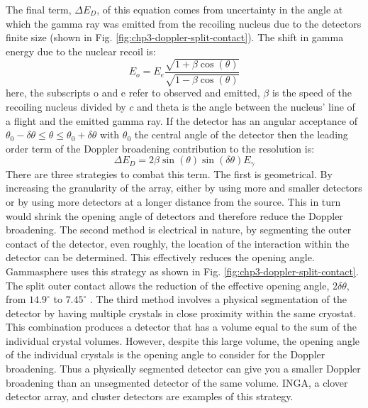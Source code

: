 The final term, $\Delta{}E_{D}$, of this equation comes from uncertainty in the angle at which the gamma ray was emitted from the recoiling nucleus due to the detectors finite size (shown in Fig. \ref{fig:chp3-doppler-split-contact}). The shift in gamma energy due to the nuclear recoil is:
\begin{equation}
\label{eqn:chp3-doppler_formula} 
E_{o} = E_{e}\frac{\sqrt{1+\beta{}\cos(\theta)}}{\sqrt{1-\beta{}\cos(\theta)}}
\end{equation}
here, the subscripts o and e refer to observed and emitted, $\beta$ is the speed of the recoiling nucleus divided by $c$ and theta is the angle between the nucleus' line of a flight and the emitted gamma ray. If the detector has an angular acceptance of $\theta{}_{0}-\delta{}\theta{}\leq{}\theta{}\leq{}\theta{}_{0}+\delta{}\theta{}$ with $\theta{}_{0}$ the central angle of the detector then the leading order term of the Doppler broadening contribution to the resolution is:
\begin{equation}
\label{eqn:chp3-res-doppler-term} 
\Delta{}E_{D} = 2\beta{}\sin(\theta{})\sin(\delta{}\theta{})E_{\gamma}
\end{equation}
There are three strategies to combat this term. The first is geometrical. By increasing the granularity of the array, either by using more and smaller detectors or by using more detectors at a longer distance from the source. This in turn would shrink the opening angle of detectors and therefore reduce the Doppler broadening. The second method is electrical in nature, by segmenting the outer contact of the detector, even roughly, the location of the interaction within the detector can be determined. This effectively reduces the opening angle. Gammasphere uses this strategy as shown in Fig. \ref{fig:chp3-doppler-split-contact}. The split outer contact allows the reduction of the effective opening angle, $2\delta{}\theta{}$, from $14.9^{\circ}$ to $7.45^{\circ}$ \cite{TheGS}. The third method involves a physical segmentation of the detector by having multiple crystals in close proximity within the same cryostat. This combination produces a detector that has a volume equal to the sum of the individual crystal volumes. However, despite this large volume, the opening angle of the individual crystals is the opening angle to consider for the Doppler broadening. Thus a physically segmented detector can give you a smaller Doppler broadening than an unsegmented detector of the same volume.  INGA, a clover detector array, and cluster detectors\cite{clusterDetector,cloverDet,ingaAtIUAC} are examples of this strategy.

